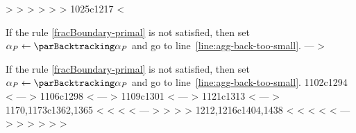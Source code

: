 > %
> %
> %
> %
> %
> %
1025c1217
< \item If the \fracBound{} rule \eqref{fracBoundary-primal} is not satisfied, then set $\alpha_{P} \gets \parBacktracking \alpha_{P}$ and go to line~\ref{line:agg-back-too-small}. 
---
> \item If the \fracBound{} rule \eqref{fracBoundary-primal} is not satisfied, then set $\alpha_{P} \gets \parBacktracking \alpha_{P}$ and go to line~\ref{line:agg-back-too-small}. 
1102c1294
< %
---
> %
1106c1298
< %
---
> %
1109c1301
<  %
---
>  %
1121c1313
< %
---
> %
1170,1173c1362,1365
< %
< %
< %
< %
---
> %
> %
> %
> %
1212,1216c1404,1438
< %
< %
< %
< %
< %
---
> %
> %
> %
> %
> %
> 

